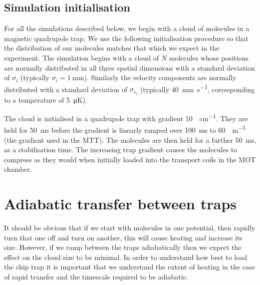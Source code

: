 
\subsection{Simulation initialisation}
\label{design:sim:init}

For all the simulations described below, we begin with a cloud of molecules in
a magnetic quadrupole trap. We use the following initialisation procedure so
that the distribution of our molecules matches that which we expect in the
experiment. 
%
The simulation begins with a cloud of $N$ molecules whose positions are normally distributed
in all three spatial dimensions with a standard deviation of $\sigma_i$
(typically $\sigma_i = \SI{1}{\milli\meter}$). Similarly the velocity components
are normally distributed with a standard deviation of $\sigma_{v_i}$ (typically
\SI{40}{\milli\meter\per\second}, corresponding to a temperature of
\SI{5}{\micro\kelvin}). 

The cloud is initialised in a quadrupole trap with gradient
\SI{10}{\gauss\per\centi\meter}. They are held for \SI{50}{\milli\second}
before the gradient is linearly ramped over \SI{100}{\milli\second} to
\SI{60}{\gauss\per\meter} (the gradient used in the MTT).  The molecules are
then held for a further \SI{50}{\milli\second}, as a stabilisation time.  The
increasing trap gradient causes the molecules to compress as they would when
initially loaded into the transport coils in the MOT chamber.


\section{Adiabatic transfer between traps}
\label{design:adiabatic}

It should be obvious that if we start with molecules in one potential, then
rapidly turn that one off and turn on another, this will cause heating and
increase its size.  However, if we ramp between the traps adiabatically then
we expect the effect on the cloud size to be minimal. In order to understand
how best to load the chip trap it is important that we understand the extent
of heating in the case of rapid transfer and the timescale required to be
adiabatic.

